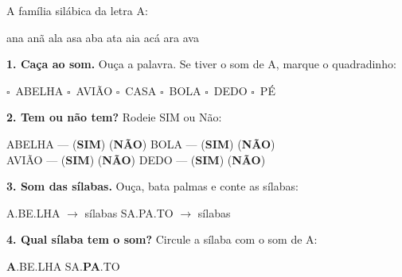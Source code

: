 
\begin{familiasilabica}
A fam\'ilia sil\'abica da letra A:

\begin{center}
ana \quad an\~a \quad ala \quad asa \quad aba \quad ata \quad aia \quad ac\'a \quad ara \quad ava
\end{center}
\end{familiasilabica}


\begin{somletra}
\textbf{1. Ca\c{c}a ao som.} Ou\c{c}a a palavra. Se tiver o som de A, marque o quadradinho:
\begin{center}
$\square$~ABELHA \quad $\square$~AVI\~AO \quad $\square$~CASA \quad $\square$~BOLA \quad $\square$~DEDO \quad $\square$~P\'E
\end{center}

\textbf{2. Tem ou n\~ao{} tem?} Rodeie SIM ou N\~ao:
\begin{center}
ABELHA --- (\textbf{SIM}) (\textbf{N\~AO}) \quad BOLA --- (\textbf{SIM}) (\textbf{N\~AO}) \\ AVI\~AO --- (\textbf{SIM}) (\textbf{N\~AO}) \quad DEDO --- (\textbf{SIM}) (\textbf{N\~AO})
\end{center}
\end{somletra}

\begin{somsilaba}
\textbf{3. Som das s\'ilabas.} Ou\c{c}a, bata palmas e conte as s\'ilabas:
\begin{center}
A.BE.LHA $\rightarrow$ \underline{\hspace{1cm}} s\'ilabas \quad SA.PA.TO $\rightarrow$ \underline{\hspace{1cm}} s\'ilabas
\end{center}

\textbf{4. Qual s\'ilaba tem o som?} Circule a s\'ilaba com o som de A:
\begin{center}
\textbf{A}.BE.LHA \quad SA.\textbf{PA}.TO
\end{center}
\end{somsilaba}



